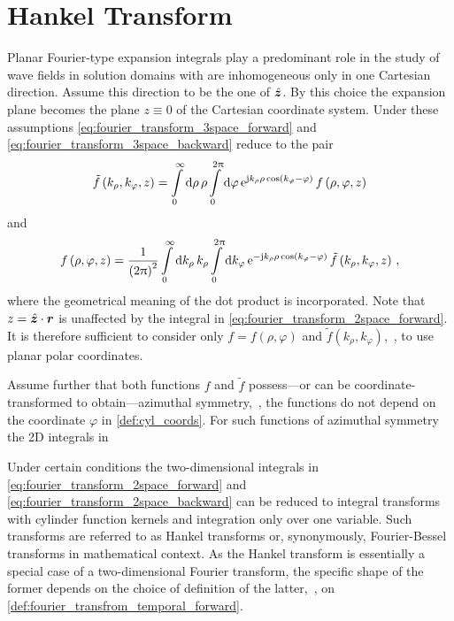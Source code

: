 \section{Hankel Transform}
\label{sec:hankel_transform}

Planar Fourier-type expansion integrals play a predominant role in the study
of wave fields in solution domains with are inhomogeneous only in one
Cartesian direction.
Assume this direction to be the one of $\uv{z}$.
By this choice the expansion plane becomes the plane $z \equiv 0$ of the
Cartesian coordinate system.
Under these assumptions \eqref{eq:fourier_transform_3space_forward}
and \eqref{eq:fourier_transform_3space_backward} reduce to the pair
\begin{equation}\label{eq:fourier_transform_2space_forward}
	\tilde{f} \left(k_\rho, k_\varphi, z\right) = 
	\int\limits_{0}^{\infty} \mathrm{d} \rho \, \rho
	\int\limits_{0}^{2\uppi} \mathrm{d} \varphi \, 
	\mathrm{e}^{\mathrm{j} k_\rho \rho \cos \left(k_\varphi - \varphi\right)}\,
	f \left(\rho, \varphi, z\right)
\end{equation}
and
\begin{equation}\label{eq:fourier_transform_2space_backward}
	f \left(\rho, \varphi, z\right) = 
	\frac{1}{\left(2\uppi\right)^2}
	\int\limits_{0}^{\infty} \mathrm{d} k_\rho \, k_\rho
	\int\limits_{0}^{2\uppi} \mathrm{d} k_\varphi \, 
	\mathrm{e}^{-\mathrm{j} k_\rho \rho \cos \left(k_\varphi - \varphi\right)}\,
	\tilde{f} \left(k_\rho, k_\varphi, z\right)
	\, ,
\end{equation}
where the geometrical meaning of the dot product is incorporated.
Note that $z = \uv{z} \cdot \pvec{r}$ is unaffected by the integral in
\eqref{eq:fourier_transform_2space_forward}.
It is therefore sufficient to consider only $f = f\left(\rho, \varphi\right)$
and $\tilde{f} \left(k_\rho, k_\varphi\right)$,~\ie, to use planar polar
coordinates.

Assume further that both functions $f$ and $\tilde{f}$ possess---or
can be coordinate-transformed to obtain---azimuthal symmetry,~\ie, the
functions do not depend on the coordinate $\varphi$ in \cref{def:cyl_coords}.
For such functions of azimuthal symmetry the 2D integrals in 

Under certain conditions the two-dimensional integrals in
\eqref{eq:fourier_transform_2space_forward} and 
\eqref{eq:fourier_transform_2space_backward} can be reduced to integral
transforms with cylinder function kernels and integration only over one
variable.
Such transforms are referred to as Hankel transforms or, synonymously,
Fourier-Bessel transforms in mathematical context.
As the Hankel transform is essentially a special case of a two-dimensional
Fourier transform, the specific shape of the former depends on the choice of
definition of the latter,~\ie, on \cref{def:fourier_transfrom_temporal_forward}.

